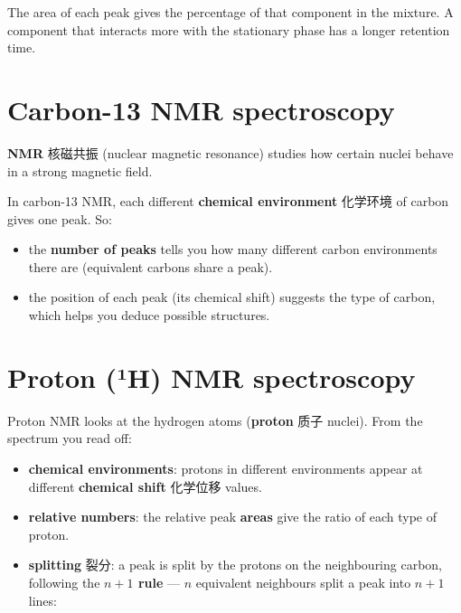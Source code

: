 \documentclass[11pt]{article}
\begin{document}
The area of each peak gives the percentage of that component in the mixture. A component that interacts more with the stationary phase has a longer retention time.

\section*{Carbon-13 NMR spectroscopy}

\textbf{NMR} 核磁共振 (nuclear magnetic resonance) studies how certain nuclei behave in a strong magnetic field.

In carbon-13 NMR, each different \textbf{chemical environment} 化学环境 of carbon gives one peak. So:

\begin{itemize}
\item the \textbf{number of peaks} tells you how many different carbon environments there are (equivalent carbons share a peak).

\item the position of each peak (its chemical shift) suggests the type of carbon, which helps you deduce possible structures.

\end{itemize}

\section*{Proton (¹H) NMR spectroscopy}

Proton NMR looks at the hydrogen atoms (\textbf{proton} 质子 nuclei). From the spectrum you read off:

\begin{itemize}
\item \textbf{chemical environments}: protons in different environments appear at different \textbf{chemical shift} 化学位移 values.

\item \textbf{relative numbers}: the relative peak \textbf{areas} give the ratio of each type of proton.

\item \textbf{splitting} 裂分: a peak is split by the protons on the neighbouring carbon, following the \textbf{$n+1$ rule} — $n$ equivalent neighbours split a peak into $n+1$ lines:

\end{itemize}

\begin{center}
\end{center}
\end{document}

